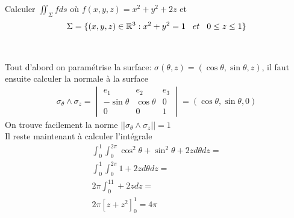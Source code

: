 \begin{myExample}
	Calculer $\iint_\Sigma fds$ où $f(x,y,z)=x^2+y^2+2z$ et  
	\begin{eqnarray*}
		\Sigma=\{(x,y,z)\in\mathbb{R}^3:x^2+y^2=1\hspace{3 mm}et\hspace{3 mm}0\leq z\leq1\}
	\end{eqnarray*}
	\\\\
	Tout d'abord on paramétrise la surface: $\sigma(\theta, z)=(\cos \theta, \sin \theta, z)$, il faut ensuite calculer la normale à la surface
	\begin{eqnarray*}
		\sigma_\theta \wedge \sigma_z=
		\begin{vmatrix}
		e_1&e_2&e_3
		\\
		-\sin \theta&\cos\theta&0
		\\
		0&0&1
		\end{vmatrix}
		=(\cos\theta,\sin\theta,0)
	\end{eqnarray*}
	On trouve facilement la norme $||\sigma_\theta \wedge \sigma_z||=1$
	\\
	Il reste maintenant à calculer l'intégrale
	\begin{eqnarray*}
		\int_0^1\int_0^{2\pi}\cos^2\theta+\sin^2\theta+2zd\theta dz=
		\\
		\int_0^1\int_0^{2\pi}1+2zd\theta dz=
		\\
		2\pi\int_0^11+2zdz=
		\\
		2\pi\left[z+z^2\right]_0^1=4\pi
	\end{eqnarray*}
\end{myExample}

